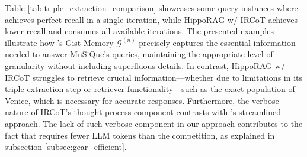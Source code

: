 Table \ref{tab:triple_extraction_comparison} showcases some query instances where \gear achieves perfect recall in a single iteration, while HippoRAG w$/$ IRCoT achieves lower recall and consumes all available iterations. The presented examples illustrate how \gear's Gist Memory $\mathcal{G}^{(n)}$ precisely captures the essential information needed to answer MuSiQue's queries, maintaining the appropriate level of granularity without including superfluous details. In contrast, HippoRAG w/ IRCoT struggles to retrieve crucial information—whether due to limitations in its triple extraction step or retriever functionality—such as the exact population of Venice, which is necessary for accurate responses. Furthermore, the verbose nature of IRCoT's thought process component contrasts with \gear's streamlined approach. The lack of such verbose component in our approach contributes to the fact that \gear requires fewer LLM tokens than the competition, as explained in subsection \ref{subsec:gear_efficient}. 
